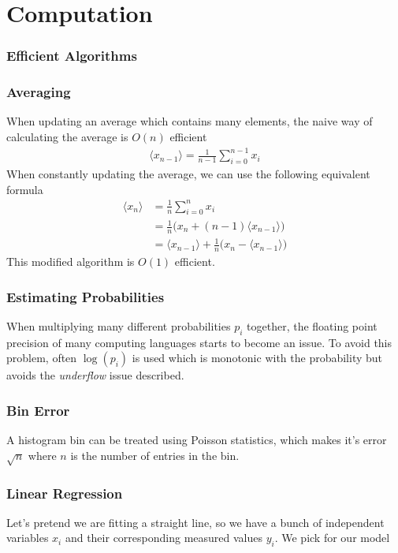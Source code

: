 \chapter{Computation}

\subsection{Efficient Algorithms}

\subsection{Averaging}
When updating an average which contains many elements, the naive way of calculating the average is $O(n)$ efficient 
\begin{align}
	\langle x_{n-1}\rangle = \frac{1}{n-1}\sum_{i=0}^{n-1} x_i
\end{align}
When constantly updating the average, we can use the following equivalent formula
\begin{align}
	\langle x_{n}\rangle &= \frac{1}{n}\sum_{i=0}^{n} x_i\\
	&= \frac{1}{n}\Big(x_n + (n-1)\langle x_{n-1}\rangle\Big)\\
	&= \langle x_{n-1}\rangle + \frac{1}{n}\Big(x_n - \langle x_{n-1} \rangle\Big)
\end{align}
This modified algorithm is $O(1)$ efficient.

\subsection{Estimating Probabilities}
When multiplying many different probabilities $p_i$ together, the floating point precision of many computing languages starts to become an issue. To avoid this problem, often $\log(p_i)$ is used which is monotonic with the probability but avoids the \textit{underflow} issue described.

\subsection{Bin Error}
A histogram bin can be treated using Poisson statistics, which makes it's error $\sqrt{n}$ where $n$ is the number of entries in the bin.


\subsection{Linear Regression}\label{least-squares}
Let's pretend we are fitting a straight line, so we have a bunch of independent variables $x_i$ and their corresponding measured values $y_i$. We pick for our model

